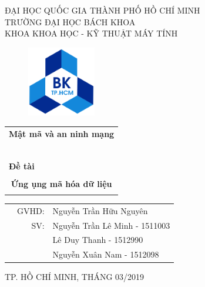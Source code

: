 \documentclass[a4paper]{article}
\begin{document}
\begin{titlepage}
\begin{center}
ĐẠI HỌC QUỐC GIA THÀNH PHỐ HỒ CHÍ MINH \\
TRƯỜNG ĐẠI HỌC BÁCH KHOA \\
KHOA KHOA HỌC - KỸ THUẬT MÁY TÍNH 
\end{center}

\vspace{1cm}

\begin{figure}[htp]
\begin{center}
\includegraphics[width=3cm]{hcmut.png}
\end{center}
\end{figure}

\vspace{1cm}


\begin{center}
\begin{tabular}{c}
\multicolumn{1}{l}{\textbf{{\Large Mật mã và an ninh mạng}}}\\
~~\\
\hline
\\
\multicolumn{1}{l}{\textbf{{\Large Đề tài}}}\\
\\
\textbf{{\Huge Ứng ụng mã hóa dữ liệu}}\\
\\
\hline
\end{tabular}
\end{center}

\vspace{3cm}

\begin{table}[h]
\begin{tabular}{rrl}
\hspace{5 cm} & GVHD: & Nguyễn Trần Hữu Nguyên\\
& SV: & Nguyễn Trần Lê Minh - 1511003 \\
& & Lê Duy Thanh - 1512990 \\
& & Nguyễn Xuân Nam - 1512098\\
\end{tabular}
\end{table}

\begin{center}
{\footnotesize TP. HỒ CHÍ MINH, THÁNG 03/2019}
\end{center}
\end{titlepage}
\end{document}
